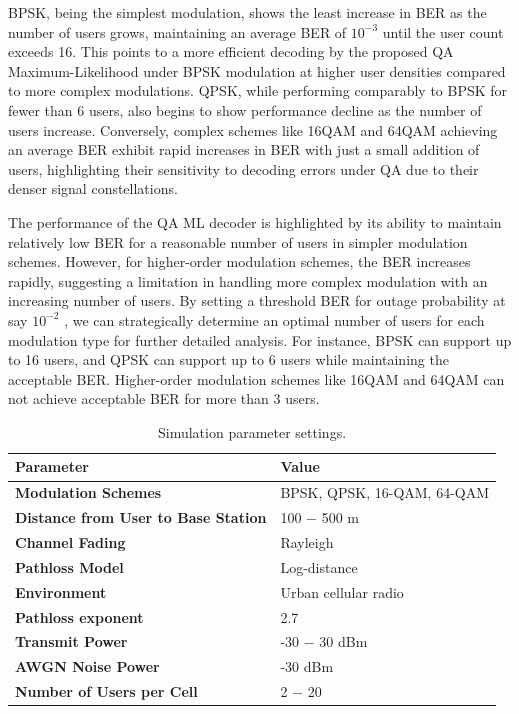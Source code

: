 BPSK, being the simplest modulation, shows the least increase in BER as the number of users grows, maintaining an average BER of $10^{-3}$ until the user count exceeds 16. This points to a more efficient decoding by the proposed QA Maximum-Likelihood under BPSK modulation at higher user densities compared to more complex modulations. QPSK, while performing comparably to BPSK for fewer than 6 users, also begins to show performance decline as the number of users increase. Conversely, complex schemes like 16QAM and 64QAM achieving an average BER  exhibit rapid increases in BER with just a small addition of users, highlighting their sensitivity to decoding errors under QA due to their denser signal constellations.

The performance of the QA ML decoder is highlighted by its ability to maintain relatively low BER for a reasonable number of users in simpler modulation schemes. However, for higher-order modulation schemes, the BER increases rapidly, suggesting a limitation in handling more complex modulation with an increasing number of users.
By setting a threshold BER for outage probability at say $10^{-2}$ , we can strategically determine an optimal number of users for each modulation type for further detailed analysis. For instance, BPSK can support up to 16 users, and QPSK can support up to 6 users while maintaining the acceptable BER. Higher-order modulation schemes like 16QAM and 64QAM can not achieve acceptable BER for more than 3 users.
\vspace{1cm}
\begin{table}[ht]
\centering
\caption{Simulation parameter settings.}
\label{tab:simulation_parameters}
\begin{tabular}{>{\bfseries}l l}
\toprule
Parameter                           & Value \\
\midrule
Modulation Schemes                  & BPSK, QPSK, 16-QAM, 64-QAM \\
Distance from User to Base Station  & 100 $-$ 500 m \\
Channel Fading                      & Rayleigh \\
Pathloss Model                      & Log-distance \\
Environment                      & Urban cellular radio \\
Pathloss exponent                      & 2.7 \\
Transmit Power                      & -30 $-$ 30 dBm \\
AWGN Noise Power                    & -30 dBm \\
Number of Users per Cell            & 2 $-$ 20 \\
\bottomrule
\end{tabular}
\end{table}

